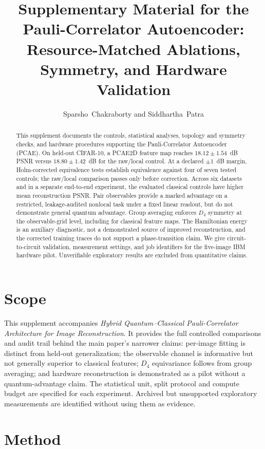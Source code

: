 \documentclass[11pt]{article}
\title{Supplementary Material for the Pauli-Correlator Autoencoder:\\ Resource-Matched Ablations, Symmetry, and Hardware Validation}
\author{Sparsho~Chakraborty and Siddhartha~Patra}
\date{}
\begin{document}
\maketitle

\begin{abstract}
This supplement documents the controls, statistical analyses, topology and symmetry checks, and hardware procedures supporting the Pauli-Correlator Autoencoder (PCAE). On held-out CIFAR-10, a PCAE2D feature map reaches $18.12\pm1.54$~dB PSNR versus $18.80\pm1.42$~dB for the raw/local control. At a declared $\pm1$~dB margin, Holm-corrected equivalence tests establish equivalence against four of seven tested controls; the raw/local comparison passes only before correction. Across six datasets and in a separate end-to-end experiment, the evaluated classical controls have higher mean reconstruction PSNR. Pair observables provide a marked advantage on a restricted, leakage-audited nonlocal task under a fixed linear readout, but do not demonstrate general quantum advantage. Group averaging enforces $D_4$ symmetry at the observable-grid level, including for classical feature maps. The Hamiltonian energy is an auxiliary diagnostic, not a demonstrated source of improved reconstruction, and the corrected training traces do not support a phase-transition claim. We give circuit-to-circuit validation, measurement settings, and job identifiers for the five-image IBM hardware pilot. Unverifiable exploratory results are excluded from quantitative claims.
\end{abstract}


\section{Scope}
This supplement accompanies \textit{Hybrid Quantum--Classical Pauli-Correlator Architecture for Image Reconstruction}. It provides the full controlled comparisons and audit trail behind the main paper's narrower claims: per-image fitting is distinct from held-out generalization; the observable channel is informative but not generally superior to classical features; $D_4$ equivariance follows from group averaging; and hardware reconstruction is demonstrated as a pilot without a quantum-advantage claim. The statistical unit, split protocol and compute budget are specified for each experiment. Archived but unsupported exploratory measurements are identified without using them as evidence.

\section{Method}
\end{document}
